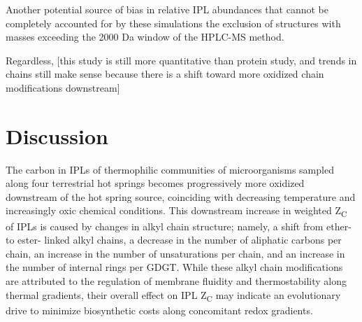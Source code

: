 Another potential source of bias in relative IPL abundances that cannot be completely accounted for by these simulations the exclusion of structures with masses exceeding the 2000 Da window of the HPLC-MS method.

Regardless, [this study is still more quantitative than protein study, and trends in chains still make sense because there is a shift toward more oxidized chain modifications downstream]



\section{Discussion}

The carbon in IPLs of thermophilic communities of microorganisms sampled along four terrestrial hot springs becomes progressively more oxidized downstream of the hot spring source, coinciding with decreasing temperature and increasingly oxic chemical conditions. This downstream increase in weighted Z\textsubscript{C} of IPLs is caused by changes in alkyl chain structure; namely, a shift from ether- to ester- linked alkyl chains, a decrease in the number of aliphatic carbons per chain, an increase in the number of unsaturations per chain, and an increase in the number of internal rings per GDGT. While these alkyl chain modifications are attributed to the regulation of membrane fluidity and thermostability along thermal gradients, their overall effect on IPL Z\textsubscript{C} may indicate an evolutionary drive to minimize biosynthetic costs along concomitant redox gradients.

